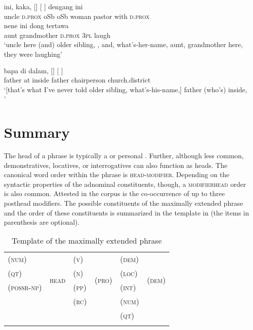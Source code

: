 \ea
\label{Example_8.97}
 {{ini,}} {{kaka,}} {[]} {{[}} {]} {dengang} {ini}\\ %
 uncle  {\textsc{d.prox}}  {oSb}  oSb  {woman}  pastor  with  \textsc{d.prox}\\
  {nene}  {ini}  dong  {tertawa}\\
 {aunt}  {grandmother}  {\textsc{d.prox}}  \textsc{3pl}  {laugh}\\
\glt 
‘uncle here (and) older sibling, , and, what’s-her-name, aunt, grandmother here, they were laughing’ \textstyleExampleSource{[080922-001a-CvPh.0824]}
\z

\ea
\label{Example_8.98}
\gll {\ldots} {bapa} {di} {dalam,} {[]} {[} {]}\\ %
  { }  father  at  inside  father  chairperson  church.district\\
\glt
‘[that’s what I’ve never told older sibling, what’s-his-name,] father (who’s) inside, ’ \textstyleExampleSource{[080922-010a-CvNF.0104]}
\z


\section{Summary}
\label{Para_8.6}
The head of a  phrase is typically a  or personal . Further, although less common, demonstratives, locatives, or interrogatives can also function as heads. The canonical word order within the  phrase is \textsc{head-modifier}. Depending on the syntactic properties of the adnominal constituents, though, a \textsc{modifierhead} order is also common. Attested in the corpus is the co-occurr\-ence of up to three posthead modi\-fiers. The possible constituents of the maximally extended  phrase and the order of these constituents is summarized in the template in   (the items in parenthesis are optional).


\begin{table}
\caption{Template of the maximally extended  phrase}\label{Table_8.3}

\begin{tabular}{llllll}
\lsptoprule
(\textsc{num}) & \multirow{4}{*}{\textsc{head}} & (\textsc{v}) & \multirow{4}{*}{(\textsc{pro})} & (\textsc{dem}) & \multirow{4}{*}{(\textsc{dem})}\\
(\textsc{qt}) &  & (\textsc{n}) &  & (\textsc{loc}) & \\
(\textsc{possr-np}) &  & (\textsc{pp}) &  & (\textsc{int}) & \\
&  & (\textsc{rc}) &  & (\textsc{num}) & \\
&  &  &  & (\textsc{qt}) & \\
\lspbottomrule
\end{tabular}
\end{table}

